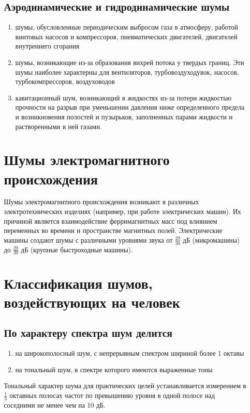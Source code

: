 \documentclass[a5paper, 12pt, twoside]{article}
\begin{document}
\subsection{Аэродинамические и гидродинамические шумы}
\begin{enumerate}
    \item шумы, обусловленные периодическим выбросом газа в атмосферу, работой винтовых насосов и компрессоров, пневматических двигателей, двигателей внутреннего сгорания
    \item шумы, возникающие из-за образования вихрей потока у твердых границ. Эти шумы наиболее характерны для вентиляторов, турбовоздуходувок, насосов, турбокомпрессоров, воздуховодов
    \item кавитационный шум, возникающий в жидкостях из-за потери жидкостью прочности на разрыв при уменьшении давления ниже определенного предела и возникновения полостей и пузырьков, заполненных парами жидкости и растворенными в ней газами.
\end{enumerate}

\section{Шумы электромагнитного происхождения}
Шумы электромагнитного происхождения возникают в различных электротехнических изделиях (например, при работе электрических машин). Их причиной является взаимодействие ферримагнитных масс под влиянием переменных во времени и пространстве магнитных полей. Электрические машины создают шумы с различными уровнями звука от \(\frac{20}{30}\) дБ (микромашины) до \(\frac{20}{30}\) дБ (крупные быстроходные машины).

\section{Классификация шумов, воздействующих на человек}
\subsection{По характеру спектра шум делится}
\begin{enumerate}
    \item на широкополосный шум, с непрерывным спектром шириной более 1 октавы
    \item на тональный шум, в спектре которого имеются выраженные тоны
\end{enumerate}
Тональный характер шума для практических целей устанавливается измерением в \(\frac{1}{3}\) октавных полосах частот по превышению уровня в одной полосе над соседними не менее чем на 10 дБ.
\end{document}
